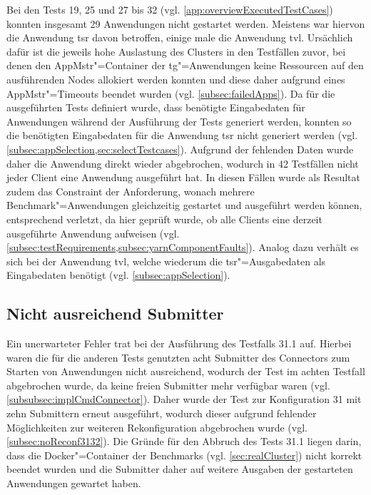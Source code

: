 Bei den Tests 19, 25 und 27 bis 32  (vgl. \cref{app:overviewExecutedTestCases}) konnten insgesamt 29 Anwendungen nicht gestartet werden.
Meistens war hiervon die Anwendung \acrlong{tsr} davon betroffen, einige male die Anwendung \acrlong{tvl}.
Ursächlich dafür ist die jeweils hohe Auslastung des Clusters in den Testfällen zuvor, bei denen den \gls{AppMstr}"=Container der \acrlong{tg}"=Anwendungen keine Ressourcen auf den ausführenden Nodes allokiert werden konnten und diese daher aufgrund eines \gls{AppMstr}"=Timeouts beendet wurden (vgl. \cref{subsec:failedApps}).
Da für die ausgeführten Tests definiert wurde, dass benötigte Eingabedaten für Anwendungen während der Ausführung der Tests generiert werden, konnten so die benötigten Eingabedaten für die Anwendung \acrlong{tsr} nicht generiert werden (vgl. \cref{subsec:appSelection,sec:selectTestcases}).
Aufgrund der fehlenden Daten wurde daher die Anwendung direkt wieder abgebrochen, wodurch in 42 Testfällen nicht jeder Client eine Anwendung ausgeführt hat.
In diesen Fällen wurde als Resultat zudem das Constraint der Anforderung, wonach mehrere Benchmark"=Anwendungen gleichzeitig gestartet und ausgeführt werden können, entsprechend verletzt, da hier geprüft wurde, ob alle Clients eine derzeit ausgeführte Anwendung aufweisen (vgl. \cref{subsec:testRequirements,subsec:yarnComponentFaults}).
Analog dazu verhält es sich bei der Anwendung \acrlong{tvl}, welche wiederum die \acrlong{tsr}"=Ausgabedaten als Eingabedaten benötigt (vgl. \cref{subsec:appSelection}).

\subsection{Nicht ausreichend Submitter}
\label{subsec:notEnoughSubmitter}

Ein unerwarteter Fehler trat bei der Ausführung des Testfalls 31.1 auf.
Hierbei waren die für die anderen Tests genutzten acht Submitter des Connectors zum Starten von Anwendungen nicht ausreichend, wodurch der Test im achten Testfall abgebrochen wurde, da keine freien Submitter mehr verfügbar waren (vgl. \cref{subsubsec:implCmdConnector}).
Daher wurde der Test zur Konfiguration 31 mit zehn Submittern erneut ausgeführt, wodurch dieser aufgrund fehlender Möglichkeiten zur weiteren Rekonfiguration abgebrochen wurde (vgl. \cref{subsec:noReconf3132}).
Die Gründe für den Abbruch des Tests 31.1 liegen darin, dass die Docker"=Container der Benchmarks (vgl. \cref{sec:realCluster}) nicht korrekt beendet wurden und die Submitter daher auf weitere Ausgaben der gestarteten Anwendungen gewartet haben.
